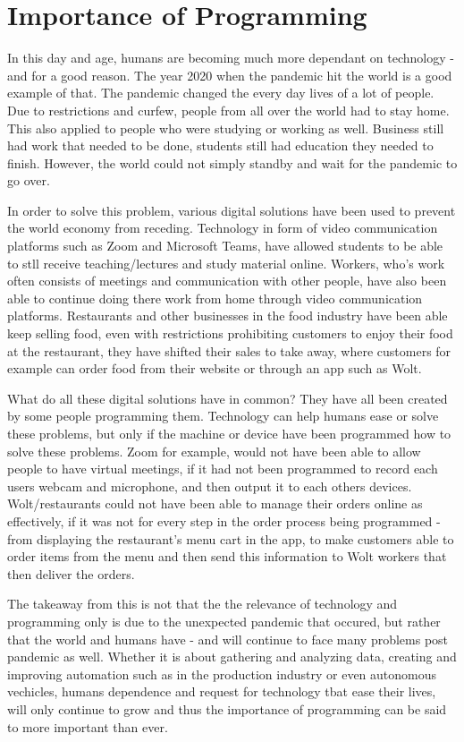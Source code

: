 \chapter{Importance of Programming} \label{chap:importance_of_programming}

In this day and age, humans are becoming much more dependant on technology - 
and for a good reason. The year 2020 when the pandemic hit the world is a good example of that.
The pandemic changed the every day lives of a lot of people. Due to restrictions and curfew,
people from all over the world had to stay home. This also applied to people 
who were studying or working as well. Business still had work that needed to be done,
students still had education they needed to finish. However, the world could not simply 
standby and wait for the pandemic to go over. 

In order to solve this problem,
various digital solutions have been used to prevent the world economy from receding.
Technology in form of video communication platforms such as Zoom and Microsoft Teams,
have allowed students to be able to stll receive teaching/lectures and study material online. 
Workers, who's work often consists of meetings and communication with other people,
have also been able to continue doing there work from home through video communication platforms. 
Restaurants and other businesses in the food industry have been able keep selling food, 
even with restrictions prohibiting customers to enjoy their food at the restaurant, 
they have shifted their sales to take away, where customers for example can order
food from their website or through an app such as Wolt. \newline


What do all these digital solutions have in common? They have all been created by 
some people programming them. Technology can help humans ease or solve these problems, 
but only if the machine or device have been programmed how to solve these problems. 
Zoom for example, would not have been able to allow people to have virtual meetings, 
if it had not been programmed to record each users webcam and microphone, and then output
it to each others devices. Wolt/restaurants could not have been able to manage
their orders online as effectively, if it was not for every step in the order process
being programmed - from displaying the restaurant's menu cart in the app, to make customers
able to order items from the menu and then send this information to Wolt workers that then 
deliver the orders. \newline

The takeaway from this is not that the the relevance of technology and programming 
only is due to the unexpected pandemic that occured,
but rather that the world and humans have - and will continue to face many problems post pandemic as well. Whether it is about gathering and analyzing data,
creating and improving automation such as in the production industry or even autonomous vechicles,
humans dependence and request for technology tbat ease their lives, will only continue
to grow and thus the importance of programming can be said to more important than ever.






